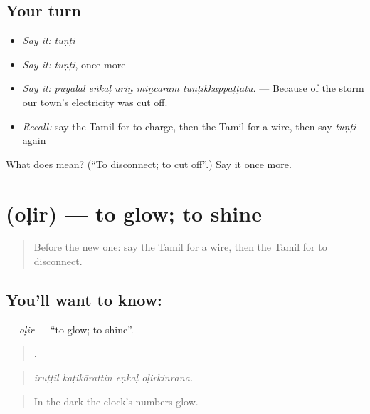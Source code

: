 \subsection*{Your turn}
\begin{itemize}
\raggedright
  \item \emph{Say it:} \emph{tuṇṭi}
  \item \emph{Say it:} \emph{tuṇṭi}, once more
  \item \emph{Say it:} \emph{puyalāl eṅkaḷ ūriṉ miṉcāram tuṇṭikkappaṭṭatu.} — Because of the storm our town's electricity was cut off.
  \item \emph{Recall:} say the Tamil for to charge, then the Tamil for a wire, then say \emph{tuṇṭi} again
\end{itemize}

\begin{tcolorbox}[breakable,colback=teal!4,colframe=teal!35!black,title={Before you move on}]
What does  mean? (\textquotedblleft{}To disconnect; to cut off\textquotedblright{}.) Say it once more.
\end{tcolorbox}
\section[\texorpdfstring{\ta{ஒளிர்} (oḷir)}{ஒளிர் (oḷir)}]{ (oḷir) — to glow; to shine}

\label{lesson:TA-C517-olir}



\begin{quote}
Before the new one: say the Tamil for a wire, then the Tamil for to disconnect.
\end{quote}

\subsection*{You'll want to know: }
\textbf{} — \emph{oḷir} — \textquotedblleft{}to glow; to shine\textquotedblright{}.

\begin{quote}
   .
\end{quote}

\begin{quote}
\emph{iruṭṭil kaṭikārattiṉ eṇkaḷ oḷirkiṉṟaṉa.}
\end{quote}

\begin{quote}
In the dark the clock's numbers glow.
\end{quote}

